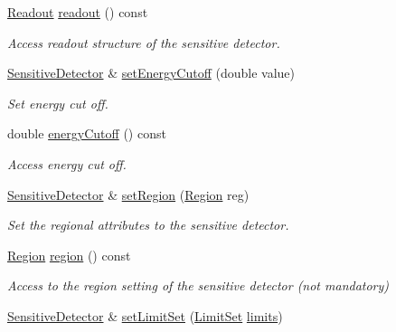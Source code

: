\begin{DoxyCompactItemize}
\hyperlink{class_d_d4hep_1_1_geometry_1_1_readout}{Readout} \hyperlink{class_d_d4hep_1_1_geometry_1_1_sensitive_detector_ad79f39c5b360f7ecf2341de990131eb2}{readout} () const
\begin{DoxyCompactList}\small\item\em Access readout structure of the sensitive detector. \end{DoxyCompactList}\item 
\hyperlink{class_d_d4hep_1_1_geometry_1_1_sensitive_detector}{Sensitive\+Detector} \& \hyperlink{class_d_d4hep_1_1_geometry_1_1_sensitive_detector_a43bc3d1e14b74fbaa85043dedb940a39}{set\+Energy\+Cutoff} (double value)
\begin{DoxyCompactList}\small\item\em Set energy cut off. \end{DoxyCompactList}\item 
double \hyperlink{class_d_d4hep_1_1_geometry_1_1_sensitive_detector_a2479d4a77da32c469715c4c2f491b345}{energy\+Cutoff} () const
\begin{DoxyCompactList}\small\item\em Access energy cut off. \end{DoxyCompactList}\item 
\hyperlink{class_d_d4hep_1_1_geometry_1_1_sensitive_detector}{Sensitive\+Detector} \& \hyperlink{class_d_d4hep_1_1_geometry_1_1_sensitive_detector_a3fafb658e1cc5dbe7a1683e5420cce46}{set\+Region} (\hyperlink{class_d_d4hep_1_1_geometry_1_1_region}{Region} reg)
\begin{DoxyCompactList}\small\item\em Set the regional attributes to the sensitive detector. \end{DoxyCompactList}\item 
\hyperlink{class_d_d4hep_1_1_geometry_1_1_region}{Region} \hyperlink{class_d_d4hep_1_1_geometry_1_1_sensitive_detector_a2dc0653c5940496cd8931f75cb4f0d48}{region} () const
\begin{DoxyCompactList}\small\item\em Access to the region setting of the sensitive detector (not mandatory) \end{DoxyCompactList}\item 
\hyperlink{class_d_d4hep_1_1_geometry_1_1_sensitive_detector}{Sensitive\+Detector} \& \hyperlink{class_d_d4hep_1_1_geometry_1_1_sensitive_detector_a24994b8d62969f2d16e1cdf543a8e9bc}{set\+Limit\+Set} (\hyperlink{class_d_d4hep_1_1_geometry_1_1_limit_set}{Limit\+Set} \hyperlink{class_d_d4hep_1_1_geometry_1_1_sensitive_detector_afc33394fa07a926f2707681a66b291df}{limits})

\end{DoxyCompactItemize}
